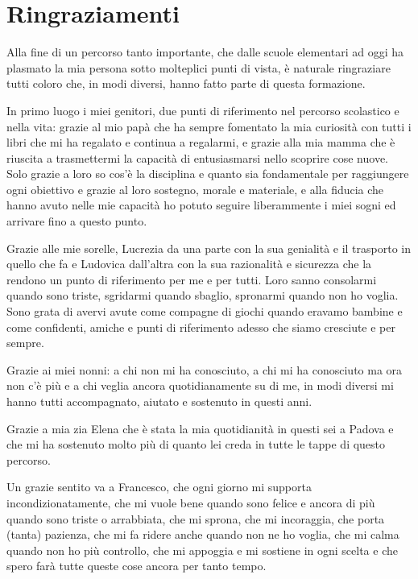 \chapter*{Ringraziamenti}
Alla fine di un percorso tanto importante, che dalle scuole elementari ad oggi ha plasmato la mia persona sotto molteplici punti di vista, 
è naturale ringraziare tutti coloro che, in modi diversi, hanno fatto parte di questa formazione.

In primo luogo i miei genitori, due punti di riferimento nel percorso scolastico e nella vita: grazie al mio papà che ha sempre fomentato la mia curiosità con tutti i libri che mi ha regalato e continua a regalarmi, e grazie alla mia mamma che è riuscita a trasmettermi la capacità di entusiasmarsi nello scoprire cose nuove. Solo grazie a loro so cos'è la disciplina e quanto sia fondamentale per raggiungere ogni obiettivo e grazie al loro sostegno, morale e materiale, e alla fiducia che hanno avuto nelle mie capacità ho potuto seguire liberammente i miei sogni ed arrivare fino a questo punto.

Grazie alle mie sorelle, Lucrezia da una parte con la sua genialità e il trasporto in quello che fa e Ludovica dall'altra con la sua razionalità e sicurezza che la rendono un punto di riferimento per me e per tutti. Loro sanno consolarmi quando sono triste, sgridarmi quando sbaglio, spronarmi quando non ho voglia. Sono grata di avervi avute come compagne di giochi quando eravamo bambine e come confidenti, amiche e punti di riferimento adesso che siamo cresciute e per sempre. 

Grazie ai miei nonni: a chi non mi ha conosciuto, a chi mi ha conosciuto ma ora non c'è più e a chi veglia ancora quotidianamente su di me, in modi diversi mi hanno tutti accompagnato, aiutato e sostenuto in questi anni. 

Grazie a mia zia Elena che è stata la mia quotidianità in questi sei a Padova e che mi ha sostenuto molto più di quanto lei creda in tutte le tappe di questo percorso.

Un grazie sentito va a Francesco, che ogni giorno mi supporta incondizionatamente, che mi vuole bene quando sono felice e ancora di più quando sono triste o arrabbiata, che mi sprona, che mi incoraggia, che porta (tanta) pazienza, che mi fa ridere anche quando non ne ho voglia, che mi calma quando non ho più controllo, che mi appoggia e mi sostiene in ogni scelta e che spero farà tutte queste cose ancora per tanto tempo.

